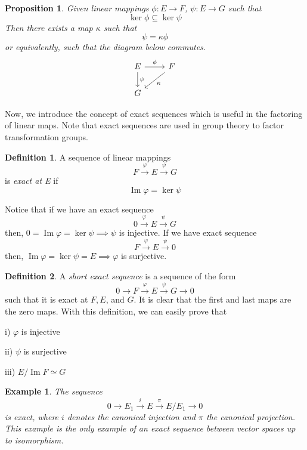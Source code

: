 \documentclass{article}
\DeclareMathOperator{\im}{Im}
\newtheorem{proposition}[theorem]{Proposition}
\newtheorem{example}{Example}[section]
\theoremstyle{remark}
\theoremstyle{definition}
\newtheorem{definition}{Definition}[section]
\begin{document}
\begin{proposition}
Given linear mappings $\phi: E \longrightarrow F$, $\psi: E \longrightarrow G$ such that
\[\ker{\phi} \subseteq \ker{\psi}\]
Then there exists a map $\kappa$ such that 
\[ \psi = \kappa \phi\]
or equivalently, such that the diagram below commutes. 
\[\begin{tikzcd} 
    E \arrow{r}{\phi} \arrow{d}{\psi} & F \arrow{dl}{\kappa} \\
    G 
\end{tikzcd}\]
\end{proposition}

Now, we introduce the concept of exact sequences which is useful in the factoring of linear maps. Note that exact sequences are used in group theory to factor transformation groups. 

\begin{definition}
A sequence of linear mappings 
\[F \xrightarrow{\varphi} E \xrightarrow{\psi} G\]
is \textit{exact at E} if
\[ \im{\varphi} = \ker{\psi}\]
\end{definition}

Notice that if we have an exact sequence 
\[0 \xrightarrow{\varphi} E \xrightarrow{\psi} G\]
then, $0 = \im{\varphi} = \ker{\psi} \implies \psi$ is injective. If we have exact sequence 
\[F \xrightarrow{\varphi} E \xrightarrow{\psi} 0\]
then, $\im{\varphi} = \ker{\psi} = E \implies \varphi$ is surjective. 

\begin{definition}
A \textit{short exact sequence} is a sequence of the form
\[0 \xrightarrow{} F \xrightarrow{\varphi} E \xrightarrow{\psi} G \xrightarrow{} 0\]
such that it is exact at $F, E$, and $G$. It is clear that the first and last maps are the zero maps. With this definition, we can easily prove that

i) $\varphi$ is injective

ii) $\psi$ is surjective

iii) $E / \im{F} \simeq G$
\end{definition}

\begin{example}
The sequence 
\[0 \xrightarrow{} E_1 \xrightarrow{i} E \xrightarrow{\pi} E / E_1 \xrightarrow{} 0\]
is exact, where $i$ denotes the canonical injection and $\pi$ the canonical projection. This example is the only example of an exact sequence between vector spaces up to isomorphism. 
\end{example}
\end{document}
